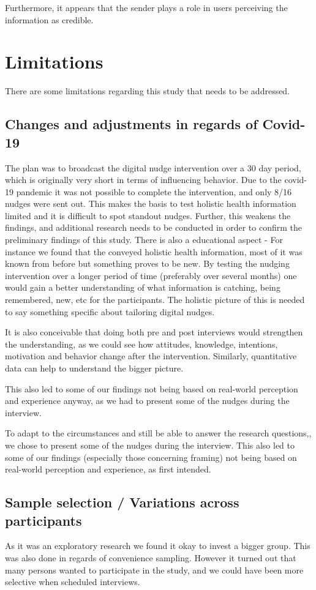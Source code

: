 Furthermore, it appears that the sender plays a role in users perceiving the information as credible.

\section{Limitations}
There are some limitations regarding this study that needs to be addressed.

\subsection{Changes and adjustments in regards of Covid-19 }
The plan was to broadcast the digital nudge intervention over a 30 day period, which is originally very short in terms of influencing behavior. Due to the covid-19 pandemic it was not possible to complete the intervention, and only 8/16 nudges were sent out. This makes the basis to test holistic health information limited and it is difficult to spot standout nudges. Further, this weakens the findings, and additional research needs to be conducted in order to confirm the preliminary findings of this study. There is also a educational aspect - For instance we found that the conveyed holistic health information, most of it was known from before but something proves to be new. By testing the nudging intervention over a longer period of time (preferably over several months) one would gain a better understanding of what information is catching, being remembered, new, etc for the participants. The holistic picture of this is needed to say something specific about tailoring digital nudges. 

It is also conceivable that doing both pre and post interviews would strengthen the understanding, as we could see how attitudes, knowledge, intentions, motivation and behavior change after the intervention. Similarly, quantitative data can help to understand the bigger picture.

This also led to some of our findings not being based on real-world perception and experience anyway, as we had to present some of the nudges during the interview.

To adapt to the circumstances and still be able to answer the research questions,, we chose to present some of the nudges during the interview. This also led to some of our findings (especially those concerning framing) not being based on real-world perception and experience, as first intended. 

\subsection{Sample selection / Variations across participants}
As it was an exploratory research we found it okay to invest a bigger group. This was also done in regards of convenience sampling. However it turned out that many persons wanted to participate in the study, and we could have been more selective when scheduled interviews. 


